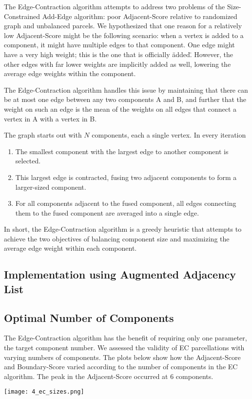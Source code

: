 The Edge-Contraction algorithm attempts to address two problems of
the Size-Constrained Add-Edge algorithm: poor Adjacent-Score relative
to randomized graph and unbalanced parcels. We hypothesized that one
reason for a relatively low Adjacent-Score might be the following
scenario: when a vertex is added to a component, it might have multiple
edges to that component. One edge might have a very high weight; this is
the one that is officially \"added\". However, the other edges with far
lower weights are implicitly added as well, lowering the average edge
weights within the component.

The Edge-Contraction algorithm handles this issue by maintaining that
there can be at most one edge between any two components A and B, and
further that the weight on such an edge is the mean of the weights on
all edges that connect a vertex in A with a vertex in B.

The graph starts out with $N$ components, each a single vertex. In every
iteration

\begin{enumerate}[1.]
\item
The smallest component with the largest edge to another component is
selected.

\item
This largest edge is contracted, fusing two adjacent components to form
a larger-sized component.

\item
For all components adjacent to the fused component, all edges connecting
them to the fused component are averaged into a single edge.
\end{enumerate}

In short, the Edge-Contraction algorithm is a greedy heuristic that
attempts to achieve the two objectives of balancing component size
and maximizing the average edge weight within each component.

\subsection{Implementation using Augmented Adjacency List}


\subsection{Optimal Number of Components}

The Edge-Contraction algorithm has the benefit of requiring only one
parameter, the target component number. We assessed the validity of EC
parcellations with varying numbers of components. The plots below show
how the Adjacent-Score and Boundary-Score varied according to the
number of components in the EC algorithm. The peak in the Adjacent-Score
occurred at 6 components.

\texttt{[image: 4\_ec\_sizes.png]}

\begin{center}

\end{center}